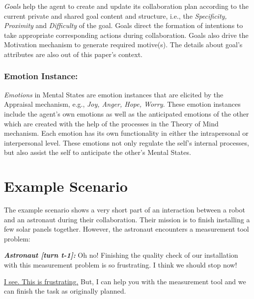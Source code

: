 \documentclass[letterpaper]{article}
\begin{document}
\textit{Goals} help the agent to create and update its collaboration plan
according to the current private and shared goal content and structure, i.e.,
the \textit{Specificity, Proximity} and \textit{Difficulty} of the goal. Goals
direct the formation of intentions to take appropriate corresponding actions
during collaboration. Goals also drive the Motivation mechanism to generate
required motive(s). The details about goal's attributes are also out of this
paper's context.

\vspace*{-1mm}
\subsubsection{Emotion Instance:}

\textit{Emotions} in Mental States are emotion instances that are elicited by
the Appraisal mechanism, e.g., \textit{Joy, Anger, Hope, Worry}. These emotion
instances include the agent's own emotions as well as the anticipated emotions
of the other which are created with the help of the processes in the Theory of
Mind mechanism. Each emotion has its own functionality in either the
intrapersonal or interpersonal level. These emotions not only regulate the
self's internal processes, but also assist the self to anticipate the other's
Mental States.

\vspace*{-3mm}
\section{Example Scenario}

The example scenario shows a very short part of an interaction between a robot
and an astronaut during their collaboration. Their mission is to finish
installing a few solar panels together. However, the astronaut encounters a
measurement tool problem:

\vspace*{-1mm}
\begin{description}
  \item \textit{\textbf{\fontsize{9pt}{12pt}\selectfont Astronaut [turn t-1]:}}
  Oh no! Finishing the quality check of our installation with this measurement
  problem is so frustrating. I think we should stop now!

  \item \textit{\textbf{\fontsize{9pt}{12pt}\selectfont{Robot [turn t]:}}}
  \underline{I see. This is frustrating.} But, I can help you with the
  measurement tool and we can finish the task as originally planned.
\end{description}
\end{document}
